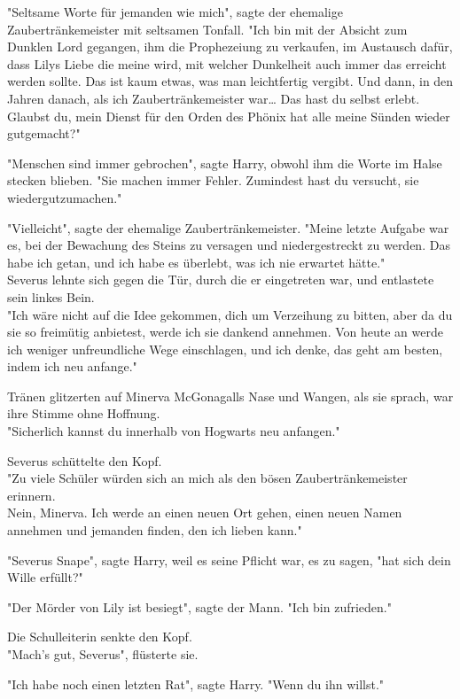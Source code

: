 {"Seltsame Worte für jemanden wie mich", sagte der ehemalige Zaubertränkemeister mit seltsamen Tonfall. "Ich bin mit der Absicht zum Dunklen Lord gegangen, ihm die Prophezeiung zu verkaufen, im Austausch dafür, dass Lilys Liebe die meine wird, mit welcher Dunkelheit auch immer das erreicht werden sollte. Das ist kaum etwas, was man leichtfertig vergibt. Und dann, in den Jahren danach, als ich Zaubertränkemeister war… Das hast du selbst erlebt. Glaubst du, mein Dienst für den Orden des Phönix hat alle meine Sünden wieder gutgemacht?"

"Menschen sind immer gebrochen", sagte Harry, obwohl ihm die Worte im Halse stecken blieben. "Sie machen immer Fehler. Zumindest hast du versucht, sie wiedergutzumachen."

"Vielleicht", sagte der ehemalige Zaubertränkemeister. "Meine letzte Aufgabe war es, bei der Bewachung des Steins zu versagen und niedergestreckt zu werden. Das habe ich getan, und ich habe es überlebt, was ich nie erwartet hätte."\\ Severus lehnte sich gegen die Tür, durch die er eingetreten war, und entlastete sein linkes Bein.\\ "Ich wäre nicht auf die Idee gekommen, dich um Verzeihung zu bitten, aber da du sie so freimütig anbietest, werde ich sie dankend annehmen. Von heute an werde ich weniger unfreundliche Wege einschlagen, und ich denke, das geht am besten, indem ich neu anfange."

Tränen glitzerten auf Minerva McGonagalls Nase und Wangen, als sie sprach, war ihre Stimme ohne Hoffnung.\\ "Sicherlich kannst du innerhalb von Hogwarts neu anfangen."

Severus schüttelte den Kopf.\\ "Zu viele Schüler würden sich an mich als den bösen Zaubertränkemeister erinnern.\\ Nein, Minerva. Ich werde an einen neuen Ort gehen, einen neuen Namen annehmen und jemanden finden, den ich lieben kann."

"Severus Snape", sagte Harry, weil es seine Pflicht war, es zu sagen, "hat sich dein Wille erfüllt?"

"Der Mörder von Lily ist besiegt", sagte der Mann. "Ich bin zufrieden."

Die Schulleiterin senkte den Kopf.\\ "Mach's gut, Severus", flüsterte sie.

"Ich habe noch einen letzten Rat", sagte Harry. "Wenn du ihn willst."

}
